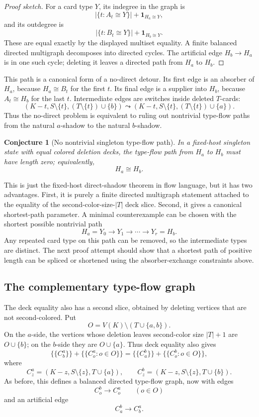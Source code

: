 \documentclass[11pt]{article}
\newtheorem{conjecture}{Conjecture}
\newcommand{\one}{\mathbf{1}}
\begin{document}
\begin{proof}[Proof sketch]
For a card type \(Y\), its indegree in the graph is
\[
  |\{t:A_t\cong Y\}|+\one_{H_a\cong Y},
\]
and its outdegree is
\[
  |\{t:B_t\cong Y\}|+\one_{H_b\cong Y}.
\]
These are equal exactly by the displayed multiset equality.  A finite
balanced directed multigraph decomposes into directed cycles.  The artificial
edge \(H_b\to H_a\) is in one such cycle; deleting it leaves a directed path
from \(H_a\) to \(H_b\).
\end{proof}

This path is a canonical form of a no-direct detour.  Its first edge is an
absorber of \(H_a\), because \(H_a\cong B_t\) for the first \(t\).  Its final
edge is a supplier into \(H_b\), because \(A_t\cong H_b\) for the last \(t\).
Intermediate edges are switches inside deleted \(T\)-cards:
\[
  (K-t,S\setminus\{t\},(T\setminus\{t\})\cup\{b\})
  \leadsto
  (K-t,S\setminus\{t\},(T\setminus\{t\})\cup\{a\}).
\]
Thus the no-direct problem is equivalent to ruling out nontrivial type-flow
paths from the natural \(a\)-shadow to the natural \(b\)-shadow.

\begin{conjecture}[No nontrivial singleton type-flow path]
In a fixed-host singleton state with equal colored deletion decks, the
type-flow path from \(H_a\) to \(H_b\) must have length zero; equivalently,
\[
  H_a\cong H_b.
\]
\end{conjecture}

This is just the fixed-host direct-shadow theorem in flow language, but it
has two advantages.  First, it is purely a finite directed multigraph
statement attached to the equality of the second-color-size-\(|T|\) deck
slice.  Second, it gives a canonical shortest-path parameter.  A minimal
counterexample can be chosen with the shortest possible nontrivial path
\[
  H_a=Y_0\to Y_1\to\cdots\to Y_r=H_b.
\]
Any repeated card type on this path can be removed, so the intermediate
types are distinct.  The next proof attempt should show that a shortest path
of positive length can be spliced or shortened using the absorber-exchange
constraints above.

\subsection{The complementary type-flow graph}

The deck equality also has a second slice, obtained by deleting vertices that
are not second-colored.  Put
\[
  O=V(K)\setminus(T\cup\{a,b\}).
\]
On the \(a\)-side, the vertices whose deletion leaves second-color size
\(|T|+1\) are \(O\cup\{b\}\); on the \(b\)-side they are \(O\cup\{a\}\).
Thus deck equality also gives
\[
  \{\!\{C_b^a\}\!\}+\{\!\{C_o^a:o\in O\}\!\}
  =
  \{\!\{C_a^b\}\!\}+\{\!\{C_o^b:o\in O\}\!\},
\]
where
\[
  C_z^a=(K-z,S\setminus\{z\},T\cup\{a\}),
  \qquad
  C_z^b=(K-z,S\setminus\{z\},T\cup\{b\}).
\]
As before, this defines a balanced directed type-flow graph, now with edges
\[
  C_o^b\longrightarrow C_o^a
  \qquad(o\in O)
\]
and an artificial edge
\[
  C_a^b\longrightarrow C_b^a.
\]
\end{document}
